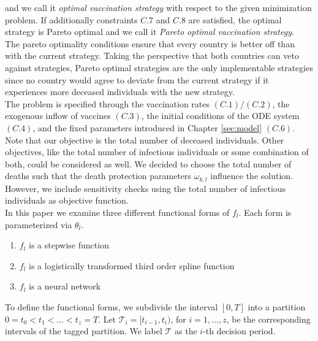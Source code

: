 and we call it \textit{optimal vaccination strategy} with respect to the given minimization problem. If additionally constraints $C.7$ and $C.8$ are satisfied, the optimal strategy is Pareto optimal and we call it \textit{Pareto optimal vaccination strategy}. \\

The pareto optimality conditions ensure that every country is better off than with the current strategy. Taking the perspective that both countries can veto against strategies, Pareto optimal strategies are the only implementable strategies since no country would agree to deviate from the current strategy if it experiences more deceased individuals with the new strategy.  \\

The problem is specified through the vaccination rates $(C.1)/(C.2)$, the exogenous inflow of vaccines $(C.3)$, the initial conditions of the ODE system $(C.4)$, and the fixed parameters introduced in Chapter \ref{sec:model} $(C.6)$. Note that our objective is the total number of deceased individuals. Other objectives, like the total number of infectious individuals or some combination of both, could be considered as well. We decided to choose the total number of deaths such that the death protection parameters $\omega_{k,l}$ influence the solution. However, we include sensitivity checks using the total number of infectious individuals as objective function. \\

In this paper we examine three different functional forms of $f_{l}$. Each form is parameterized via $\theta_l$.
\begin{enumerate}
\item $f_{l}$ is a stepwise function
\item $f_{l}$ is a logistically transformed third order spline function
\item $f_{l}$ is a neural network
\end{enumerate}
To define the functional forms, we subdivide the interval $[0,T]$ into a partition $0=t_0 < t_1 < \dots < t_z = T$. Let $\mathcal{T}_i = [t_{i-1}, t_{i})$, for $i = 1, \dots, z$, be the corresponding intervals of the tagged partition. We label $\mathcal{T}$ as the $i$-th decision period. \\   

